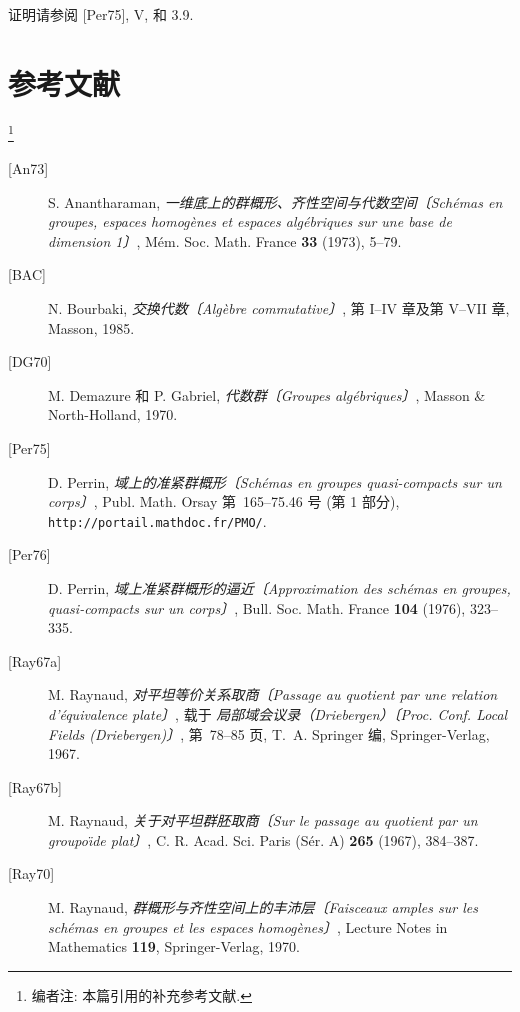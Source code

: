 证明请参阅 \textup{[Per75]}, V,  和 3.9.

\section*{参考文献}
\label{bib:sga3-VIA}
\footnote{\label{note:sga3-VIA-59}编者注: 本篇引用的补充参考文献.}

\begin{description}
\item[{[An73]}] S. Anantharaman,
  \emph{一维底上的群概形、齐性空间与代数空间〔Sch\'emas en groupes, espaces homog\`enes et espaces
  alg\'ebriques sur une base de dimension 1〕},
  M\'em. Soc. Math. France \textbf{33} (1973), 5--79.
\item[{[BAC]}] N. Bourbaki,
  \emph{交换代数〔Alg\`ebre commutative〕}, 第 I--IV 章及第 V--VII 章,
  Masson, 1985.
\item[{[DG70]}] M. Demazure 和 P. Gabriel,
  \emph{代数群〔Groupes alg\'ebriques〕}, Masson \& North-Holland, 1970.
\item[{[Per75]}] D. Perrin,
  \emph{域上的准紧群概形〔Sch\'emas en groupes quasi-compacts sur un corps〕},
  Publ. Math. Orsay 第~165--75.46 号 (第 1 部分),
  \texttt{http://portail.mathdoc.fr/PMO/}.
\item[{[Per76]}] D. Perrin,
  \emph{域上准紧群概形的逼近〔Approximation des sch\'emas en groupes, quasi-compacts
  sur un corps〕}, Bull. Soc. Math. France \textbf{104} (1976),
  323--335.
\item[{[Ray67a]}] M. Raynaud,
  \emph{对平坦等价关系取商〔Passage au quotient par une relation d'\'equivalence
  plate〕}, 载于 \emph{局部域会议录（Driebergen）〔Proc. Conf. Local Fields
  (Driebergen)〕}, 第~78--85 页, T.~A. Springer 编, Springer-Verlag, 1967.
\item[{[Ray67b]}] M. Raynaud,
  \emph{关于对平坦群胚取商〔Sur le passage au quotient par un groupo\"\i de plat〕},
  C. R. Acad. Sci. Paris (S\'er. A) \textbf{265} (1967),
  384--387.
\item[{[Ray70]}] M. Raynaud,
  \emph{群概形与齐性空间上的丰沛层〔Faisceaux amples sur les sch\'emas en groupes et les
  espaces homog\`enes〕}, Lecture Notes in Mathematics
  \textbf{119}, Springer-Verlag, 1970.
\end{description}


